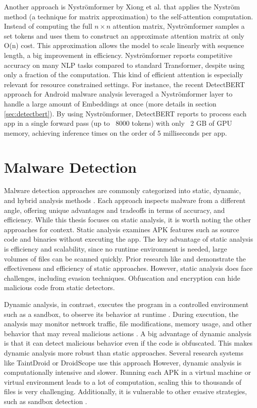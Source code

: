 Another approach is Nyströmformer \cite{nystromformer} by Xiong et al. 
that applies the Nyström method (a technique for matrix approximation) to the self-attention computation.
Instead of computing the full $n \times n$ attention matrix, 
Nyströmformer samples a set tokens and uses them to construct an approximate attention matrix 
at only O(n) cost. 
This approximation allows the model to scale linearly with sequence length, 
a big improvement in efficiency. 
Nyströmformer reports competitive accuracy on many NLP tasks compared to 
standard Transformer, despite using only a fraction of the computation. 
This kind of efficient attention is especially relevant for resource constrained settings.
For instance, the recent DetectBERT \cite{detectbert} approach for Android malware analysis 
leveraged a Nyströmformer layer to handle a large amount of Embeddings at once 
(more details in section \ref{sec:detectbert}). 
By using Nyströmformer, DetectBERT reports to process each app in a single forward pass (up to ~8000 tokens) 
with only ~2 GB of GPU memory, achieving inference times on the order of 5 milliseconds per app. 

\section{Malware Detection}

Malware detection approaches are commonly categorized into static, dynamic, and hybrid analysis methods \cite{vorlesung}.
Each approach inspects malware from a different angle, 
offering unique advantages and tradeoffs in terms of accuracy, and efficiency.
While this thesis focuses on static analysis, it is worth noting the other approaches for context.
Static analysis examines APK features such as source code and binaries without executing the app.
The key advantage of static analysis is efficiency and scalability, 
since no runtime environment is needed, large volumes of files can be scanned quickly.
Prior research like \cite{drebin} and \cite{detectbert} demonstrate the effectiveness and efficiency of static approaches.
However, static analysis does face challenges, including evasion techniques.
Obfuscation and encryption can hide malicious code from static detectors.

Dynamic analysis, in contrast, executes the program in a controlled environment 
such as a sandbox\cite{sandbox}, to observe its behavior at runtime \cite{vorlesung}.
During execution, the analysis may monitor network traffic, file modifications, memory usage, 
and other behavior that may reveal malicious actions \cite{stateoftheartaibasedmalwaredetection}. 
A big advantage of dynamic analysis is that it can detect malicious behavior even if the code is obfuscated. 
This makes dynamic analysis more robust than static approaches.
Several research systems like TaintDroid \cite{taintdroid} or DroidScope \cite{droidscope} 
use this approach
However, dynamic analysis is computationally intensive and slower.
Running each APK in a virtual machine or virtual environment leads to a lot of computation, 
scaling this to thousands of files is very challenging.
Additionally, it is vulnerable to other evasive strategies, such as sandbox detection \cite{sandbox_detection}.

